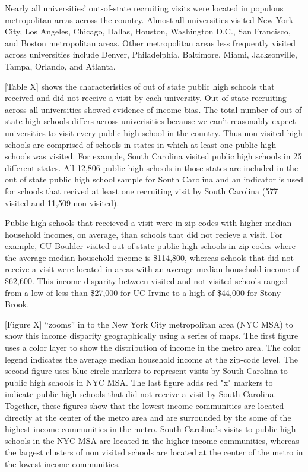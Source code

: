 \documentclass[twoside]{article}
\begin{document}
Nearly all universities' out-of-state recruiting visits were located in populous metropolitan areas across the country. Almost all universities visited New York City, Los Angeles, Chicago, Dallas, Houston, Washington D.C., San Francisco, and Boston metropolitan areas. Other metropolitan areas less frequently visited across universities include Denver, Philadelphia, Baltimore, Miami, Jacksonville, Tampa, Orlando, and Atlanta. 

[Table X] shows the characteristics of out of state public high schools that received and did not receive a visit by each university. Out of state recruiting across all universities showed evidence of income bias. The total number of out of state high schools differs across univerisities because we can't reasonably expect universities to visit every public high school in the country. Thus non visited high schools are comprised of schools in states in which at least one public high schools was visited. For example, South Carolina visited public high schools in 25 different states. All 12,806 public high schools in those states are included in the out of state public high school sample for South Carolina and an indicator is used for schools that recived at least one recruiting visit by South Carolina (577 visited and 11,509 non-visited).  

Public high schools that receieved a visit were in zip codes with higher median household incomes, on average, than schools that did not recieve a visit. For example, CU Boulder visited out of state public high schools in zip codes where the average median household income is \$114,800, whereas schools that did not receive a visit were located in areas with an average median household income of \$62,600. This income disparity between visited and not visited schools ranged from a low of less than \$27,000 for UC Irvine to a high of \$44,000 for Stony Brook. 

[Figure X] “zooms” in to the New York City metropolitan area (NYC MSA) to show this income disparity geographically using a series of maps. The first figure uses a color layer to show the distribution of income in the metro area. The color legend indicates the average median household income at the zip-code level. The second figure uses blue circle markers to represent visits by South Carolina to public high schools in NYC MSA. The last figure adds red "x" markers to indicate public high schools that did not receive a visit by South Carolina. Together, these figures show that the lowest income communities are located directly at the center of the metro area and are surrounded by the some of the highest income communities in the metro. South Carolina's visits to public high schools in the NYC MSA are located in the higher income communities, whereas the largest clusters of non visited schools are located at the center of the metro in the lowest income communities. 
\end{document}
